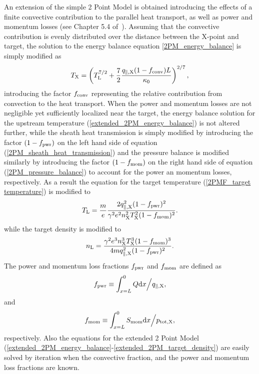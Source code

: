 \documentclass[amsmath,amssymb,a4]{revtex4}
\begin{document}
An extension of the simple 2 Point Model is obtained introducing the effects of a finite convective contribution to the parallel heat transport, as well as power and momentum losses (see Chapter 5.4 of~\cite{stangeby}). Assuming that the convective contribution is evenly distributed over the distance between the X-point and target, the solution to the energy balance equation \ref{2PM_energy_balance} is simply modified as
\begin{equation}\label{extended_2PM_energy_balance}
    T_{\rm X} = \left(T_{\rm L}^{7/2} + {7 \over 2} {q_{\parallel,\rm X} (1 - f_{\rm conv}) L \over \kappa_0}\right)^{2/7},
\end{equation}
introducing the factor $f_{\rm conv}$ representing the relative contribution from convection to the heat transport. When the power and momentum losses are not negligible yet sufficiently localized near the target, the energy balance solution for the upstream temperature (\ref{extended_2PM_energy_balance}) is not altered further, while the sheath heat transmission is simply modified by introducing the factor $(1-f_{\rm pwr})$ on the left hand side of equation (\ref{2PM_sheath_heat_transmission}) and the pressure balance is modified similarly by introducing the factor $(1-f_{\rm mom})$ on the right hand side of equation (\ref{2PM_pressure_balance}) to account for the power an momentum losses, respectively. As a result the equation for the target temperature (\ref{2PMF_target temperature}) is modified to
\begin{equation}\label{extended_2PM_target_temperature}
    T_{\rm L} = {m \over e} {2 q_{\parallel,\rm X}^2 (1-f_{\rm pwr})^2 \over \gamma^2 e^2 n_{\rm X}^2 T_{\rm X}^2 (1-f_{\rm mom})^2}.
\end{equation}
while the target density is modified to
\begin{equation}\label{extended_2PM_target_density}
    n_{\rm L} = {\gamma^2 e^3 n_{\rm X}^3 T_{\rm X}^3 (1-f_{\rm mom})^3 \over 4 m q_{\parallel,\rm X}^2 (1-f_{\rm pwr})^2}.
\end{equation}
The power and momentum loss fractions $f_{\rm pwr}$ and $f_{\rm mom}$ are defined as
\begin{equation}\label{power_loss_fraction}
    f_{\rm pwr} \equiv \int_{x=L}^0 Q {\rm d}x \Big/ q_{\parallel,\rm X},
\end{equation}
and
\begin{equation}\label{momentum_loss_fraction}
    f_{\rm mom} \equiv \int_{x=L}^0 S_{\rm mom} {\rm d}x \Big/ p_{\rm tot,X},
\end{equation}
respectively. Also the equations for the extended 2 Point Model (\ref{extended_2PM_energy_balance}-\ref{extended_2PM_target_density}) are easily solved by iteration when the convective fraction, and the power and momentum loss fractions are known.
\end{document}
